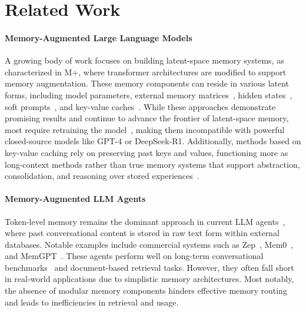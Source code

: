 \section{Related Work}


\paragraph{Memory-Augmented Large Language Models}
A growing body of work focuses on building latent-space memory systems, as characterized in M+\citep{mplus}, where transformer architectures are modified to support memory augmentation. These memory components can reside in various latent forms, including model parameters\citep{self-param}, external memory matrices~\citep{larimar,infini-attention}, hidden states~\citep{RMT, he2024camelot, memoryllm, mplus}, soft prompts~\citep{memoryTransformer}, and key-value caches~\citep{MemoryBank,cartridges,snapkv,h2o}. While these approaches demonstrate promising results and continue to advance the frontier of latent-space memory, most require retraining the model~\citep{memoryllm, mplus, infini-attention}, making them incompatible with powerful closed-source models like GPT-4 or DeepSeek-R1. Additionally, methods based on key-value caching rely on preserving past keys and values, functioning more as long-context methods rather than true memory systems that support abstraction, consolidation, and reasoning over stored experiences~\citep{lscs}.


\paragraph{Memory-Augmented LLM Agents}
Token-level memory remains the dominant approach in current LLM agents~\citep{mplus}, where past conversational content is stored in raw text form within external databases. Notable examples include commercial systems such as Zep~\citep{zep}, Mem0~\citep{mem0}, and MemGPT~\citep{memgpt}. These agents perform well on long-term conversational benchmarks~\citep{locomo,longmemeval} and document-based retrieval tasks. However, they often fall short in real-world applications due to simplistic memory architectures. Most notably, the absence of modular memory components hinders effective memory routing and leads to inefficiencies in retrieval and usage.


